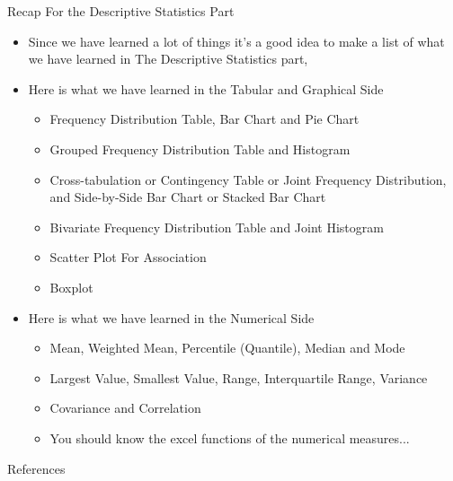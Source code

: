 \documentclass[8pt, usepdftitle=false]{beamer}
\begin{document}
\begin{frame}[allowframebreaks]{ Recap For the Descriptive Statistics Part}
  

\begin{itemize}
  \item Since we have learned a lot of things it's a good idea to make a list of what we have learned in The Descriptive Statistics part,

  \item Here is what we have learned in the Tabular and Graphical Side

  \begin{itemize}
    \item  Frequency Distribution Table, Bar Chart and Pie Chart
    \item Grouped Frequency Distribution Table and Histogram 
    \item Cross-tabulation or Contingency Table or Joint Frequency Distribution, and Side-by-Side Bar Chart or Stacked Bar Chart 
    \item Bivariate Frequency Distribution Table and Joint Histogram 
    \item Scatter Plot For Association
    \item Boxplot

  \end{itemize}

  \framebreaks

    \item Here is what we have learned in the Numerical Side
  \begin{itemize}
    \item Mean, Weighted Mean, Percentile (Quantile), Median and Mode
    \item Largest Value, Smallest Value, Range, Interquartile Range, Variance
    \item Covariance and Correlation 

    \item You should know the excel functions of the numerical measures...
  \end{itemize}


\end{itemize}

\end{frame}


\begin{frame}[allowframebreaks]{References}
 \vspace*{.3cm} 

\scriptsize

  
    
  
\end{frame}
\end{document}
